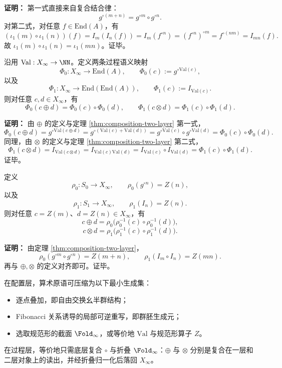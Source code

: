 \textbf{证明：}
第一式直接来自复合结合律：
\[
g^{\circ(m+n)}=g^{\circ m}\circ g^{\circ n}.
\]
对第二式，对任意 \(f\in \mathrm{End}(A)\)，有
\[
(\iota_1(m)\circ \iota_1(n))(f)
=I_m(I_n(f))
=I_m(f^{\circ n})
=(f^{\circ n})^{\circ m}
=f^{\circ(nm)}
=I_{mn}(f).
\]
故 \(\iota_1(m)\circ \iota_1(n)=\iota_1(mn)\)。证毕。

\begin{theorem}\label{thm:arith-composition}
沿用 \(\mathrm{Val}:X_\infty\to\NN\)。定义两条过程语义映射
\[
\Phi_0:X_\infty\to \mathrm{End}(A),\qquad
\Phi_0(c):=g^{\circ \mathrm{Val}(c)},
\]
以及
\[
\Phi_1:X_\infty\to \mathrm{End}(\mathrm{End}(A)),\qquad
\Phi_1(c):=I_{\mathrm{Val}(c)}.
\]
则对任意 \(c,d\in X_\infty\)，有
\[
\Phi_0(c\oplus d)=\Phi_0(c)\circ \Phi_0(d),
\qquad
\Phi_1(c\otimes d)=\Phi_1(c)\circ \Phi_1(d).
\]
\end{theorem}

\textbf{证明：}
由 \(\oplus\) 的定义与定理 \ref{thm:composition-two-layer} 第一式，
\[
\Phi_0(c\oplus d)
=g^{\circ \mathrm{Val}(c\oplus d)}
=g^{\circ(\mathrm{Val}(c)+\mathrm{Val}(d))}
=g^{\circ \mathrm{Val}(c)}\circ g^{\circ \mathrm{Val}(d)}
=\Phi_0(c)\circ \Phi_0(d).
\]
同理，由 \(\otimes\) 的定义与定理 \ref{thm:composition-two-layer} 第二式，
\[
\Phi_1(c\otimes d)
=I_{\mathrm{Val}(c\otimes d)}
=I_{\mathrm{Val}(c)\mathrm{Val}(d)}
=I_{\mathrm{Val}(c)}\circ I_{\mathrm{Val}(d)}
=\Phi_1(c)\circ \Phi_1(d).
\]
证毕。

\begin{corollary}[仅复合的读出落回稳定地址]\label{cor:composition-pullback}
定义
\[
\rho_0:S_0\to X_\infty,\qquad \rho_0(g^{\circ n})=Z(n),
\]
以及
\[
\rho_1:S_1\to X_\infty,\qquad \rho_1(I_n)=Z(n).
\]
则对任意 \(c=Z(m)\)、\(d=Z(n)\in X_\infty\)，有
\[
c\oplus d=\rho_0\bigl(\rho_0^{-1}(c)\circ \rho_0^{-1}(d)\bigr),
\]
\[
c\otimes d=\rho_1\bigl(\rho_1^{-1}(c)\circ \rho_1^{-1}(d)\bigr).
\]
\end{corollary}

\textbf{证明：}
由定理 \ref{thm:composition-two-layer}，
\[
\rho_0(g^{\circ m}\circ g^{\circ n})=Z(m+n),
\qquad
\rho_1(I_m\circ I_n)=Z(mn).
\]
再与 \(\oplus,\otimes\) 的定义对齐即可。证毕。

\begin{corollary}\label{cor:primitive-free-arith}
在配置层，算术原语可压缩为以下最小生成集：
\begin{itemize}
  \item 逐点叠加，即自由交换幺半群结构；
  \item Fibonacci 关系诱导的局部可逆重写，即群胚生成元；
  \item 选取规范形的截面 \(\Fold_\infty\)，或等价地 \(\mathrm{Val}\) 与规范形算子 \(Z\)。
\end{itemize}
在过程层，等价地只需底层复合 \(\circ\) 与折叠 \(\Fold_\infty\)：\(\oplus\) 与 \(\otimes\) 分别是复合在一层和二层对象上的读出，并经折叠归一化后落回 \(X_\infty\)。
\end{corollary}

